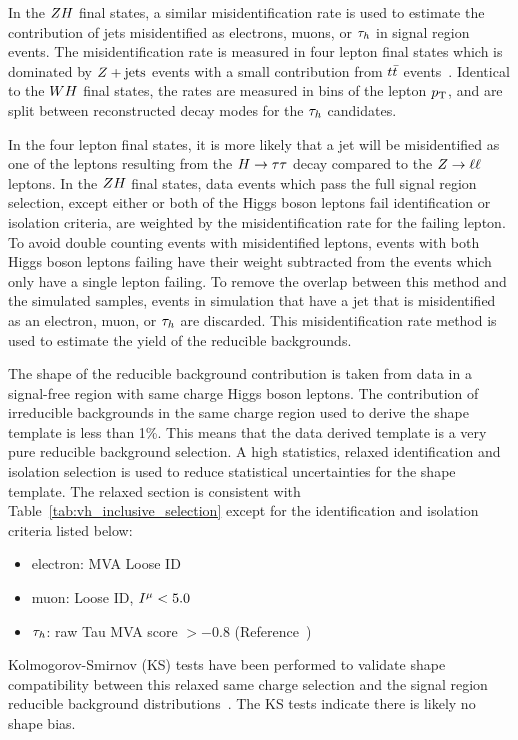 In the $ZH$ final states, a similar misidentification rate is used
to estimate the contribution of jets misidentified as electrons, muons, or $\tau_{h}$
in signal region events. The misidentification rate is measured in four lepton final states which
is dominated by $Z+\textrm{jets}$ events with a small contribution from 
$t\bar{t}$ events~\cite{HIG-18-007}. Identical to the $WH$ final states, the rates are measured 
in bins of the lepton $p_\mathrm{T}$, and are split between reconstructed decay modes for 
the $\tau_{h}$ candidates.

In the four lepton final states, it is more likely that a jet will be misidentified
as one of the leptons resulting from the $H\to\tau\tau$ decay compared to the $Z \to \ell\ell$ leptons.
In the $ZH$ final states, data events which pass the full
signal region selection, except either or both of the Higgs boson leptons 
fail identification or isolation criteria, are weighted by the misidentification
rate for the failing lepton.
To avoid double counting events with misidentified leptons, 
events with both Higgs boson leptons failing have their weight
subtracted from the events which only have a single lepton failing. 
To remove the overlap between this method and the simulated samples, events in simulation that have a jet that is 
misidentified as an electron, muon, or $\tau_{h}$ are discarded.
This misidentification rate method is used to estimate the yield of the reducible
backgrounds.

The shape of the reducible background contribution is taken from
data in a signal-free region with same charge Higgs boson leptons. The
contribution of irreducible backgrounds in the same charge region used to 
derive the shape template is less than 1\%. This means that the data derived template is
a very pure reducible background selection.
A high statistics, relaxed identification and isolation selection is used to reduce
statistical uncertainties for the shape template. The relaxed section is consistent
with Table~\ref{tab:vh_inclusive_selection} except for the identification and isolation criteria listed below:
\begin{itemize}
\item electron: MVA Loose ID
\item muon: Loose ID, $I^{\mu}<5.0$
\item $\tau_{h}$: raw Tau MVA score $> -0.8$ (Reference~\cite{CMS-PAS-TAU-16-002})
\end{itemize}

Kolmogorov-Smirnov (KS) tests have been performed to validate
shape compatibility between this relaxed same charge selection and the signal region
reducible background distributions~\cite{HIG-18-007}. The KS tests indicate there is likely no
shape bias.

